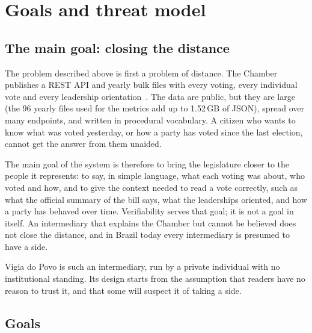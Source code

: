 \section{Goals and threat model}
\label{sec:goals}

\subsection{The main goal: closing the distance}

The problem described above is first a problem of distance. The Chamber publishes a REST API and yearly bulk files with every voting, every individual vote and every leadership orientation~\citep{camara_dadosabertos}. The data are public, but they are large (the 96 yearly files used for the metrics add up to 1.52\,GB of JSON), spread over many endpoints, and written in procedural vocabulary. A citizen who wants to know what was voted yesterday, or how a party has voted since the last election, cannot get the answer from them unaided.

The main goal of the system is therefore to bring the legislature closer to the people it represents: to say, in simple language, what each voting was about, who voted and how, and to give the context needed to read a vote correctly, such as what the official summary of the bill says, what the leaderships oriented, and how a party has behaved over time. Verifiability serves that goal; it is not a goal in itself. An intermediary that explains the Chamber but cannot be believed does not close the distance, and in Brazil today every intermediary is presumed to have a side.

Vigia do Povo is such an intermediary, run by a private individual with no institutional standing. Its design starts from the assumption that readers have no reason to trust it, and that some will suspect it of taking a side.

\subsection{Goals}

